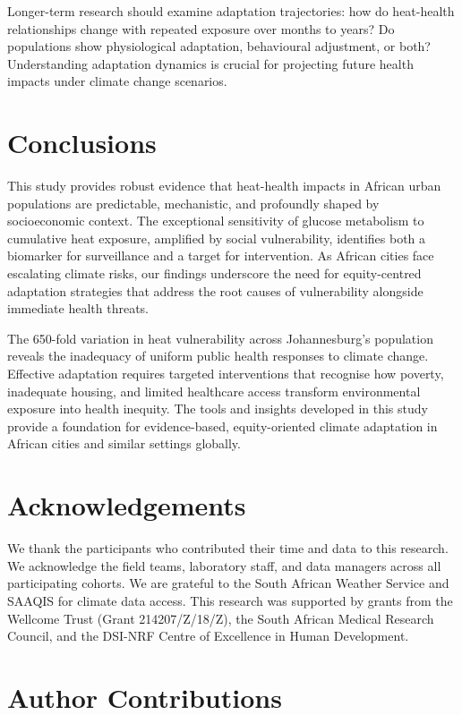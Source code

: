 \documentclass[11pt,a4paper]{article}
\begin{document}
Longer-term research should examine adaptation trajectories: how do heat-health relationships change with repeated exposure over months to years? Do populations show physiological adaptation, behavioural adjustment, or both? Understanding adaptation dynamics is crucial for projecting future health impacts under climate change scenarios.

\section{Conclusions}

This study provides robust evidence that heat-health impacts in African urban populations are predictable, mechanistic, and profoundly shaped by socioeconomic context. The exceptional sensitivity of glucose metabolism to cumulative heat exposure, amplified by social vulnerability, identifies both a biomarker for surveillance and a target for intervention. As African cities face escalating climate risks, our findings underscore the need for equity-centred adaptation strategies that address the root causes of vulnerability alongside immediate health threats.

The 650-fold variation in heat vulnerability across Johannesburg's population reveals the inadequacy of uniform public health responses to climate change. Effective adaptation requires targeted interventions that recognise how poverty, inadequate housing, and limited healthcare access transform environmental exposure into health inequity. The tools and insights developed in this study provide a foundation for evidence-based, equity-oriented climate adaptation in African cities and similar settings globally.

\section*{Acknowledgements}

We thank the participants who contributed their time and data to this research. We acknowledge the field teams, laboratory staff, and data managers across all participating cohorts. We are grateful to the South African Weather Service and SAAQIS for climate data access. This research was supported by grants from the Wellcome Trust (Grant 214207/Z/18/Z), the South African Medical Research Council, and the DSI-NRF Centre of Excellence in Human Development.

\section*{Author Contributions}
\end{document}
